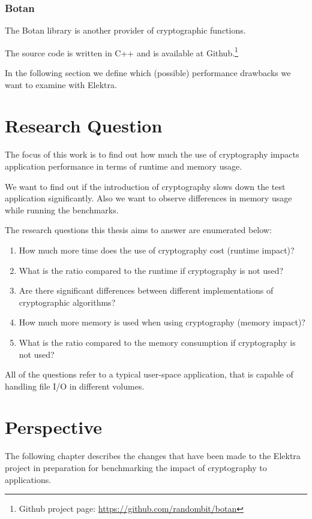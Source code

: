   \subsubsection{Botan}

The Botan library is another provider of cryptographic functions.

The source code is written in C++ and is available at Github.\footnote{Github project page: \url{https://github.com/randombit/botan}}



In the following section we define which (possible) performance drawbacks we want to examine with Elektra.

\section{Research Question}

The focus of this work is to find out how much the use of cryptography
impacts application performance in terms of runtime and memory
usage.

We want to find out if the introduction of cryptography slows down the test application significantly.
Also we want to observe differences in memory usage while running the benchmarks.

The research questions this thesis aims to answer are enumerated below:

\begin{enumerate}
\def\labelenumi{\arabic{enumi}.}
\tightlist
\item
  How much more time does the use of cryptography cost (runtime impact)?
\item
  What is the ratio compared to the runtime if cryptography is not used?
\item
  Are there significant differences between different implementations of cryptographic algorithms?
\item
  How much more memory is used when using cryptography (memory impact)?
\item
  What is the ratio compared to the memory consumption if cryptography
  is not used?
\end{enumerate}

All of the questions refer to a typical user-space application, that is capable of handling file I/O in different volumes.

\section{Perspective}

The following chapter describes the changes that have been made to the Elektra project in preparation for benchmarking the impact of cryptography to applications.

